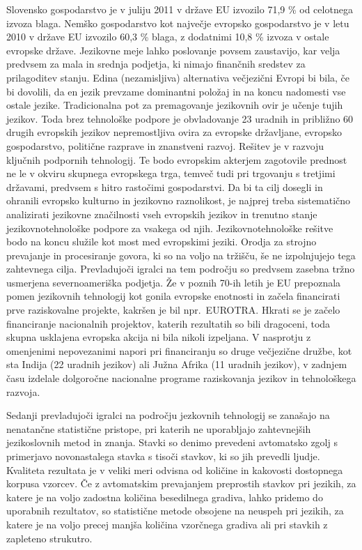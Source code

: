 \begin{multicols}{2}
Slovensko gospodarstvo je v juliju 2011 v države EU izvozilo 71,9 \% od celotnega izvoza blaga. Nemško gospodarstvo kot naj\-večje evropsko gospodarstvo je v letu 2010 v države EU izvozilo 60,3 \% blaga, z dodatnimi 10,8 \% izvoza v ostale evropske države. Jezikovne meje lahko poslovanje povsem zaustavijo, kar velja predvsem za mala in srednja podjetja, ki nimajo finančnih sredstev za prilagoditev stanju. Edina (nezamisljiva) alternativa večjezični Evropi bi bila, če bi dovolili, da en jezik prevzame dominantni položaj in na koncu nadomesti vse ostale jezike. Tradicionalna pot za premagovanje jezikovnih ovir je učenje tujih jezikov. Toda brez tehnološke podpore je obvladovanje 23 uradnih in približno 60 drugih evropskih jezikov nepremostljiva ovira za evropske držav\-ljane, evropsko gospodarstvo, politične razprave in znanstveni razvoj. Rešitev je v razvoju ključnih podpornih tehnologij. Te bodo evropskim akterjem zagotovile prednost ne le v okviru skupnega evropskega trga, temveč tudi pri trgovanju s tretjimi državami, predvsem s hitro rastočimi gospodarstvi. Da bi ta cilj dosegli in ohranili evropsko kulturno in jezikovno raznolikost, je naj\-prej treba sistema\-tično analizirati jezikovne značilnosti vseh evropskih jezikov in trenutno stanje jezikovnotehnološke podpore za vsakega od njih. Jezikovnotehnološke rešitve bodo na koncu služile kot most med evropskimi jeziki. Orodja za stroj\-no prevajanje in procesiranje go\-vora, ki so na voljo na tržišču, še ne izpolnjujejo tega zah\-tevnega cilja. Prevladujoči igralci na tem področju so predvsem zasebna tržno usmerjena severno\-ameriška podjetja. Že v poznih 70-ih letih je EU prepoznala po\-men jezikovnih tehnologij kot gonila evropske enotnosti in začela financirati prve raziskovalne projekte, kakršen je bil npr.~EUROTRA. Hkrati se je začelo financiranje nacionalnih projektov, katerih rezultatih so bili dragoceni, toda skupna usklajena evropska akcija ni bila nikoli izpeljana. V nasprotju z omenjenimi nepovezanimi napori pri financiranju so druge večjezične družbe, kot sta Indija (22 uradnih jezikov) ali Južna Afrika (11 uradnih jezikov), v zadnjem času izdelale dolgoročne nacionalne programe raziskovanja jezikov in tehnološkega razvoja.


Sedanji prevladujoči igralci na področju jezkovnih tehnologij se zanašajo na nenatančne statistične pristope, pri katerih ne uporab\-ljajo zah\-tevnej\-ših jezikoslovnih metod in znanja. Stavki so denimo prevedeni avtomatsko zgolj s primerjavo novonastalega stavka s tisoči stavkov, ki so jih prevedli ljudje. Kvaliteta rezultata je v veliki meri odvisna od količine in kakovosti dostopnega korpusa vzorcev. Če z avtomatskim prevajanjem preprostih stavkov pri jezikih, za katere je na voljo zadostna količina besedilnega gradiva, lahko pridemo do uporabnih rezultatov, so statistične metode obsojene na neuspeh pri jezikih, za katere je na voljo precej manjša količina vzorčnega gradiva ali pri stavkih z zapleteno strukutro.


\end{multicols}
